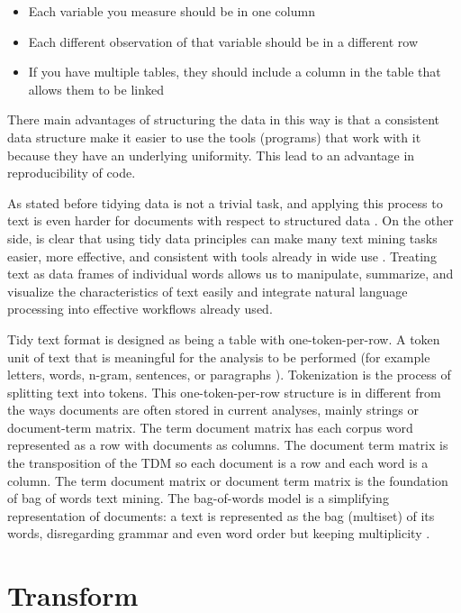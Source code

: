 \documentclass[]{book}
\providecommand{\tightlist}{%
  \setlength{\itemsep}{0pt}\setlength{\parskip}{0pt}}
\begin{document}
\begin{itemize}
\tightlist
\item
  Each variable you measure should be in one column
\item
  Each different observation of that variable should be in a different
  row
\item
  If you have multiple tables, they should include a column in the table
  that allows them to be linked
\end{itemize}

There main advantages of structuring the data in this way is that a
consistent data structure make it easier to use the tools (programs)
that work with it because they have an underlying uniformity. This lead
to an advantage in reproducibility of code.

As stated before tidying data is not a trivial task, and applying this
process to text is even harder for documents with respect to structured
data \citep{silge2016tidytext}. On the other side, is clear that using
tidy data principles can make many text mining tasks easier, more
effective, and consistent with tools already in wide use . Treating text
as data frames of individual words allows us to manipulate, summarize,
and visualize the characteristics of text easily and integrate natural
language processing into effective workflows already used.

Tidy text format is designed as being a table with one-token-per-row. A
token unit of text that is meaningful for the analysis to be performed
(for example letters, words, n-gram, sentences, or paragraphs ).
Tokenization is the process of splitting text into tokens. This
one-token-per-row structure is in different from the ways documents are
often stored in current analyses, mainly strings or document-term
matrix. The term document matrix has each corpus word represented as a
row with documents as columns. The document term matrix is the
transposition of the TDM so each document is a row and each word is a
column. The term document matrix or document term matrix is the
foundation of bag of words text mining. The bag-of-words model is a
simplifying representation of documents: a text is represented as the
bag (multiset) of its words, disregarding grammar and even word order
but keeping multiplicity \citep{mctear2016conversational}.

\section{Transform}\label{sotatoolstransform}
\end{document}
